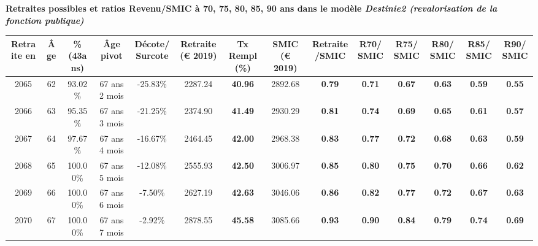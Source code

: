 \vspace{0.1cm} 
{\bf \noindent Retraites possibles et ratios Revenu/SMIC à 70, 75, 80, 85, 90 ans dans le modèle \emph{Destinie2 (revalorisation de la fonction publique)}}  
 
\begin{adjustbox}{max width=\textwidth} 
\begin{tabular}[htb]{|c|c||c|c|c||c|c||c|c||c|c|c|c|c|} 
\hline 
 Retraite en &  Âge &  \%(43ans) &  Âge pivot &  Décote/Surcote &  Retraite (\euro{} 2019) &  Tx Rempl(\%) &  SMIC (\euro{} 2019) &  Retraite/SMIC &  R70/SMIC &  R75/SMIC &  R80/SMIC &  R85/SMIC &  R90/SMIC \\ 
\hline \hline 
 2065 &  62 &  93.02\% &  67 ans 2 mois &  -25.83\% &  2287.24 &  {\bf 40.96} &  2892.68 &  {\bf {\color{red} 0.79}} &  {\bf {\color{red} 0.71}} &  {\bf {\color{red} 0.67}} &  {\bf {\color{red} 0.63}} &  {\bf {\color{red} 0.59}} &  {\bf {\color{red} 0.55}} \\ 
\hline 
 2066 &  63 &  95.35\% &  67 ans 3 mois &  -21.25\% &  2374.90 &  {\bf 41.49} &  2930.29 &  {\bf {\color{red} 0.81}} &  {\bf {\color{red} 0.74}} &  {\bf {\color{red} 0.69}} &  {\bf {\color{red} 0.65}} &  {\bf {\color{red} 0.61}} &  {\bf {\color{red} 0.57}} \\ 
\hline 
 2067 &  64 &  97.67\% &  67 ans 4 mois &  -16.67\% &  2464.45 &  {\bf 42.00} &  2968.38 &  {\bf {\color{red} 0.83}} &  {\bf {\color{red} 0.77}} &  {\bf {\color{red} 0.72}} &  {\bf {\color{red} 0.68}} &  {\bf {\color{red} 0.63}} &  {\bf {\color{red} 0.59}} \\ 
\hline 
 2068 &  65 &  100.00\% &  67 ans 5 mois &  -12.08\% &  2555.93 &  {\bf 42.50} &  3006.97 &  {\bf {\color{red} 0.85}} &  {\bf {\color{red} 0.80}} &  {\bf {\color{red} 0.75}} &  {\bf {\color{red} 0.70}} &  {\bf {\color{red} 0.66}} &  {\bf {\color{red} 0.62}} \\ 
\hline 
 2069 &  66 &  100.00\% &  67 ans 6 mois &  -7.50\% &  2627.19 &  {\bf 42.63} &  3046.06 &  {\bf {\color{red} 0.86}} &  {\bf {\color{red} 0.82}} &  {\bf {\color{red} 0.77}} &  {\bf {\color{red} 0.72}} &  {\bf {\color{red} 0.67}} &  {\bf {\color{red} 0.63}} \\ 
\hline 
 2070 &  67 &  100.00\% &  67 ans 7 mois &  -2.92\% &  2878.55 &  {\bf 45.58} &  3085.66 &  {\bf {\color{red} 0.93}} &  {\bf {\color{red} 0.90}} &  {\bf {\color{red} 0.84}} &  {\bf {\color{red} 0.79}} &  {\bf {\color{red} 0.74}} &  {\bf {\color{red} 0.69}} \\ 
\hline 
\hline 
\end{tabular} 
\end{adjustbox} 
 
